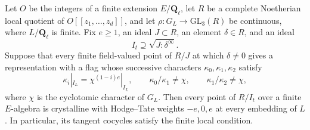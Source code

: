 \begin{proposition}
\label{prop:selmer-crystalline-components}
Let $O$ be the integers of a finite extension $E/\mathbf Q_\ell$,
let $R$ be a complete Noetherian local quotient of
$O[[z_1,\ldots,z_d]]$, and let
$\rho:G_L\to\mathrm{GL}_3(R)$ be continuous, where
$L/\mathbf Q_\ell$ is finite.  Fix $e\ge1$, an ideal $J\subset R$,
an element $\delta\in R$, and an ideal
\[
                 I_t\supseteq\sqrt{J:\delta^\infty}.
\]
Suppose that every finite field-valued point of $R/J$ at which
$\delta\ne0$ gives a representation with a flag whose successive
characters $\kappa_0,\kappa_1,\kappa_2$ satisfy
\[
 \kappa_i|_{I_L}=\chi^{(1-i)e}|_{I_L},\qquad
 \kappa_0/\kappa_1\ne\chi,\qquad
 \kappa_1/\kappa_2\ne\chi,
\]
where $\chi$ is the cyclotomic character of $G_L$.
Then every point of $R/I_t$ over a finite $E$-algebra is crystalline
with Hodge--Tate weights $-e,0,e$ at every embedding of $L$.
In particular, its tangent cocycles satisfy the finite local condition.
\end{proposition}

